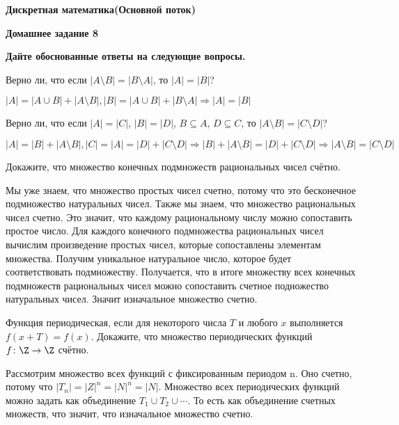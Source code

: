 \documentclass[11pt]{article}
\def\week{8}
\begin{document}
	\setcounter{problem}{0}
	\def\theproblem{Д\week.\arabic{problem}}
	{\textbf{\large Дискретная математика}\hfill \textbf{(Основной поток)}
		
		\medskip %
		
		\textbf{Домашнее задание \week}}
	
	\medskip
	
	\textbf{Дайте обоснованные ответы на следующие вопросы.}
	
	
	\vspace{5mm}
	
	\p \sp Верно ли, что если $|A\setminus B|=|B\setminus A|$, то $|A|=|B|$?
	
	$|A|= |A \cup B| + |A \setminus B|, |B| = |A \cup B| + |B \setminus A| \Rightarrow |A| = |B|$ \\
	
	\sp Верно ли, что если $|A|=|C|$, $|B|=|D|$, $B\subseteq A$, $D\subseteq C$, то $|A\setminus B|=|C\setminus D|$?
	
	$|A| = |B| + |A \setminus B|, |C| = |A| = |D| + |C \setminus D| \Rightarrow |B| + |A \setminus B| = |D| + |C \setminus D| \Rightarrow |A \setminus B| = |C \setminus D|$
	
	
	\p Докажите, что множество конечных подмножеств рациональных чисел
	счётно.
	
	Мы уже знаем, что множество простых чисел счетно, потому что это бесконечное подмножество натуральных чисел. Также мы знаем, что множество рациональных чисел счетно. Это значит, что каждому рациональному числу можно сопоставить простое число. Для каждого конечного подмножества рациональных чисел вычислим произведение простых чисел, которые сопоставлены элементам множества. Получим уникальное натуральное число, которое будет соответствовать подмножеству. Получается, что в итоге множеству всех конечных подмножеств рациональных чисел можно сопоставить счетное подножество натуральных чисел. Значит изначальное множество счетно. 
		
	\p Функция периодическая, если для
	некоторого числа $T$ и любого $x$ выполняется $f(x+T)=f(x)$. Докажите,
	что множество периодических функций  $f\colon \Z\to\Z$ счётно.
	
	Рассмотрим множество всех функций с фиксированным периодом n. Оно счетно, потому что $|T_n|= |Z|^n = |N|^n = |N|.$ Множество всех периодических функций можно задать как объединение $T_1 \cup T_2 \cup \cdots$. То есть как объединение счетных множеств, что значит, что изначальное множество счетно.
	
\end{document}
